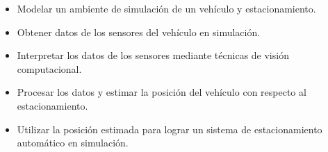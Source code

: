 
\begin{itemize}
    \item Modelar un ambiente de simulación de un vehículo y estacionamiento.
    \item Obtener datos de los sensores del vehículo en simulación.
    \item Interpretar los datos de los sensores mediante técnicas de visión computacional.
    \item Procesar los datos y estimar la posición del vehículo con respecto al estacionamiento.
    \item Utilizar la posición estimada para lograr un sistema de estacionamiento automático en simulación.
\end{itemize}
